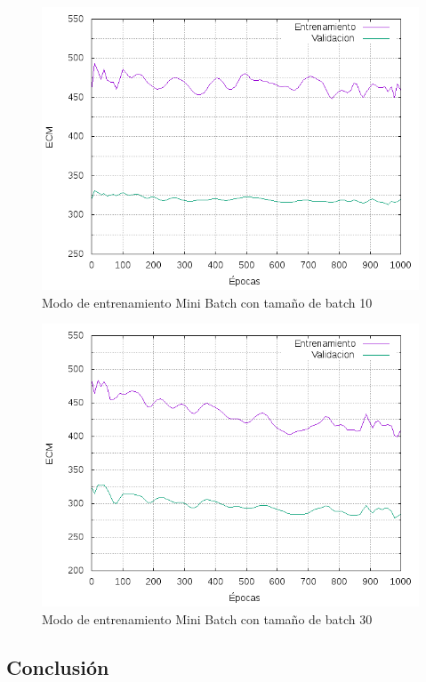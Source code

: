 \begin{figure}[h!]
  \includegraphics[width=125mm]{imagenes/ej1/ex_4-2_red_11-6-6-9-1_errors.png}
  \caption{Modo de entrenamiento Mini Batch con tamaño de batch 10}
\end{figure}

\begin{figure}[h!]
  \includegraphics[width=125mm]{imagenes/ej1/ex_4-3_red_11-6-6-9-1_errors.png}
  \caption{Modo de entrenamiento Mini Batch con tamaño de batch 30}
\end{figure}


\subsection{Conclusión}

\newpage
